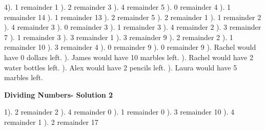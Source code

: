 \documentclass{article}%
\begin{document}
4). 1 remainder 1%
). 2 remainder 3%
). 4 remainder 5%
). 0 remainder 4%
). 1 remainder 14%
). 1 remainder 13%
). 2 remainder 5%
). 2 remainder 1%
). 1 remainder 2%
). 4 remainder 3%
). 0 remainder 3%
). 1 remainder 3%
). 4 remainder 2%
). 3 remainder 7%
). 1 remainder 3%
). 3 remainder 1%
). 3 remainder 9%
). 2 remainder 2%
). 1 remainder 10%
). 3 remainder 4%
). 0 remainder 9%
). 0 remainder 9%
). Rachel would have 0 dollars left.%
). James would have 10 marbles left.%
). Rachel would have 2 water bottles left.%
). Alex would have 2 pencils left.%
). Laura would have 5 marbles left.%
\newline%
\newpage%
\large%
\begin{center}%
\textbf{Dividing Numbers- Solution 2}%
\newline%
\end{center} \normalsize%
1). 2 remainder 2%
). 4 remainder 0%
). 1 remainder 0%
). 3 remainder 10%
). 4 remainder 1%
). 2 remainder 17%
\newline%
\end{document}
